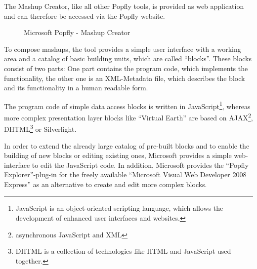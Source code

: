 The Mashup Creator, like all other Popfly tools, is provided as web application and can therefore
be accessed via the Popfly website.

\begin{figure}
	\centering
	\caption{Microsoft Popfly - Mashup Creator}
	\label{fig:microsoft_popfly_mashup_creator}
\end{figure}

To compose mashups, the tool provides a simple user interface with a working
area and a catalog of basic building units, which are called ``blocks''. These blocks consist of
two parts: One part contains the program code, which implements the functionality, the other one is an
XML-Metadata file, which describes the block and its functionality in a human readable form.

The program code of simple data access blocks is written in
JavaScript\footnote{JavaScript is an object-oriented scripting language, which
allows the development of enhanced user interfaces and websites.}, whereas more
complex presentation layer blocks like ``Virtual Earth'' are based on
AJAX\footnote{asynchronous JavaScript and XML}, DHTML\footnote{DHTML is a
collection of technologies like HTML and JavaScript used together.} or
Silverlight.

In order to extend the already large catalog of pre-built blocks and to enable
the building of new blocks or editing existing ones, Microsoft provides a simple
web-interface to edit the JavaScript code. In addition, Microsoft provides the ``Popfly
Explorer''-plug-in for the freely available ``Microsoft Visual Web Developer 2008 Express'' as an
alternative to create and edit more complex blocks.

